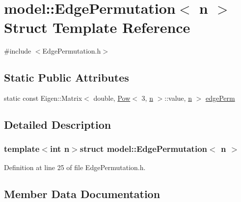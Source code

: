 \hypertarget{structmodel_1_1_edge_permutation}{}\section{model\+:\+:Edge\+Permutation$<$ n $>$ Struct Template Reference}
\label{structmodel_1_1_edge_permutation}


{\ttfamily \#include $<$Edge\+Permutation.\+h$>$}

\subsection*{Static Public Attributes}
\begin{DoxyCompactItemize}
\item 
static const Eigen\+::\+Matrix$<$ double, \hyperlink{structmodel_1_1_pow}{Pow}$<$ 3, \hyperlink{_f_e_m_2linear__elasticity__3d_2tetgen_2generate_p_o_l_ycube_8m_a74637fc31d6aedd6d61cdc0c8154bc13}{n} $>$\+::value, \hyperlink{_f_e_m_2linear__elasticity__3d_2tetgen_2generate_p_o_l_ycube_8m_a74637fc31d6aedd6d61cdc0c8154bc13}{n} $>$ \hyperlink{structmodel_1_1_edge_permutation_a550b75fe12078acbc2f40a7133397022}{edge\+Perm}
\end{DoxyCompactItemize}


\subsection{Detailed Description}
\subsubsection*{template$<$int n$>$struct model\+::\+Edge\+Permutation$<$ n $>$}



Definition at line 25 of file Edge\+Permutation.\+h.



\subsection{Member Data Documentation}
\hypertarget{structmodel_1_1_edge_permutation_a550b75fe12078acbc2f40a7133397022}{}
